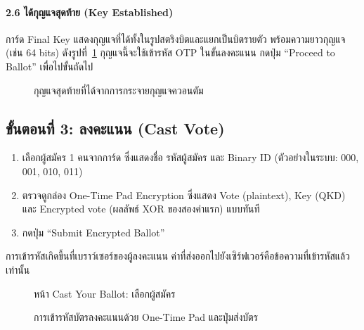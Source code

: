 \paragraph{2.6 ได้กุญแจสุดท้าย (Key Established)}
การ์ด Final Key แสดงกุญแจที่ได้ทั้งในรูปสตริงบิตและแยกเป็นบิตรายตัว
พร้อมความยาวกุญแจ (เช่น 64 bits) ดังรูปที่~\ref{fig:manual-final-key}
กุญแจนี้จะใช้เข้ารหัส OTP ในขั้นลงคะแนน กดปุ่ม ``Proceed to Ballot'' เพื่อไปขั้นถัดไป

\begin{figure}[htbp]
\centering
{}
\caption{กุญแจสุดท้ายที่ได้จากการกระจายกุญแจควอนตัม}
\label{fig:manual-final-key}
\end{figure}

\subsection{ขั้นตอนที่ 3: ลงคะแนน (Cast Vote)}

\begin{enumerate}
  \item เลือกผู้สมัคร 1 คนจากการ์ด ซึ่งแสดงชื่อ รหัสผู้สมัคร และ Binary ID
        (ตัวอย่างในระบบ: 000, 001, 010, 011) 
  \item ตรวจดูกล่อง One-Time Pad Encryption ซึ่งแสดง Vote (plaintext), Key (QKD) และ
        Encrypted vote (ผลลัพธ์ XOR ของสองค่าแรก) แบบทันที
  \item กดปุ่ม ``Submit Encrypted Ballot''
\end{enumerate}

การเข้ารหัสเกิดขึ้นที่เบราว์เซอร์ของผู้ลงคะแนน ค่าที่ส่งออกไปยังเซิร์ฟเวอร์คือข้อความที่เข้ารหัสแล้วเท่านั้น

\begin{figure}[htbp]
\centering
\caption{หน้า Cast Your Ballot: เลือกผู้สมัคร}
\label{fig:manual-cast1}
\end{figure}

\begin{figure}[htbp]
\centering
\caption{การเข้ารหัสบัตรลงคะแนนด้วย One-Time Pad และปุ่มส่งบัตร}
\label{fig:manual-cast2}
\end{figure}

